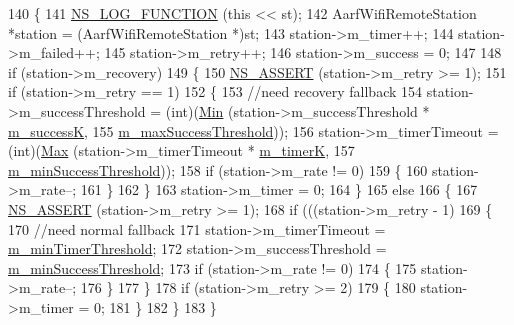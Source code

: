\begin{DoxyCode}
140 \{
141   \hyperlink{log-macros-disabled_8h_a90b90d5bad1f39cb1b64923ea94c0761}{NS\_LOG\_FUNCTION} (\textcolor{keyword}{this} << st);
142   AarfWifiRemoteStation *station = (AarfWifiRemoteStation *)st;
143   station->m\_timer++;
144   station->m\_failed++;
145   station->m\_retry++;
146   station->m\_success = 0;
147 
148   \textcolor{keywordflow}{if} (station->m\_recovery)
149     \{
150       \hyperlink{assert_8h_a6dccdb0de9b252f60088ce281c49d052}{NS\_ASSERT} (station->m\_retry >= 1);
151       \textcolor{keywordflow}{if} (station->m\_retry == 1)
152         \{
153           \textcolor{comment}{//need recovery fallback}
154           station->m\_successThreshold = (int)(\hyperlink{group__highprec_gacb0b89d5f4363bf77747ff1212f27430}{Min} (station->m\_successThreshold * 
      \hyperlink{classns3_1_1AarfWifiManager_a37e881b1ae22c8c7fd4fca36e027117a}{m\_successK},
155                                                    \hyperlink{classns3_1_1AarfWifiManager_a66100481b6ec3a506ef0fbea3de7cb7d}{m\_maxSuccessThreshold}));
156           station->m\_timerTimeout = (int)(\hyperlink{group__highprec_ga0d35bb9363c0da4cc2557158b95dbca0}{Max} (station->m\_timerTimeout * 
      \hyperlink{classns3_1_1AarfWifiManager_a3d4f7898576f87f739dd0f3746387bd1}{m\_timerK},
157                                                \hyperlink{classns3_1_1AarfWifiManager_a08955e01de046ef922862c4747ecc855}{m\_minSuccessThreshold}));
158           \textcolor{keywordflow}{if} (station->m\_rate != 0)
159             \{
160               station->m\_rate--;
161             \}
162         \}
163       station->m\_timer = 0;
164     \}
165   \textcolor{keywordflow}{else}
166     \{
167       \hyperlink{assert_8h_a6dccdb0de9b252f60088ce281c49d052}{NS\_ASSERT} (station->m\_retry >= 1);
168       \textcolor{keywordflow}{if} (((station->m\_retry - 1) %
169         \{
170           \textcolor{comment}{//need normal fallback}
171           station->m\_timerTimeout = \hyperlink{classns3_1_1AarfWifiManager_a87cd21fd98cc5330f70cb3960f5acca4}{m\_minTimerThreshold};
172           station->m\_successThreshold = \hyperlink{classns3_1_1AarfWifiManager_a08955e01de046ef922862c4747ecc855}{m\_minSuccessThreshold};
173           \textcolor{keywordflow}{if} (station->m\_rate != 0)
174             \{
175               station->m\_rate--;
176             \}
177         \}
178       \textcolor{keywordflow}{if} (station->m\_retry >= 2)
179         \{
180           station->m\_timer = 0;
181         \}
182     \}
183 \}
\end{DoxyCode}


